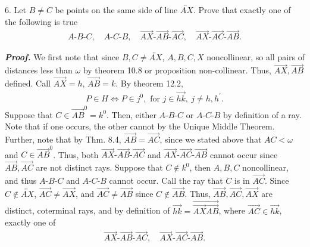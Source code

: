 \documentclass{report}
\begin{document}
    \pagebreak \bigbreak \noindent 
    \begin{mdframed}
        6. Let $B \ne C$ be points on the same side of line $\overleftrightarrow{AX}$. Prove that exactly one of the following is true
        \begin{align*}
            A\text{-}B\text{-}C, \quad A\text{-}C\text{-}B, \quad \overrightarrow{AX}\text{-}\overrightarrow{AB}\text{-}\overrightarrow{AC}, \quad \overrightarrow{AX}\text{-}\overrightarrow{AC}\text{-}\overrightarrow{AB}
        .\end{align*}
    \end{mdframed}
    \bigbreak \noindent 
    \textbf{\textit{Proof.}} We first note that since $B,C \ne \overleftrightarrow{AX}$, $A,B,C,X$ noncollinear, so all pairs of distances less than $\omega$ by theorem 10.8 or proposition non-collinear. Thus, $\overrightarrow{AX},\overrightarrow{AB}$ defined. Call $\overrightarrow{AX} = h$, $ \overrightarrow{AB} = k$. By theorem 12.2, 
    \begin{align*}
        P \in H \iff P \in j^{0}, \text{ for } j\in \overrightarrow{hk},\ j\ne h, h^{\prime}
    .\end{align*}
    \bigbreak \noindent 
    Suppose that $C \in \overrightarrow{AB}^{0} = k^{0}$. Then, either $ A\text{-}B\text{-}C$ or $ A\text{-}C\text{-}B$ by definition of a ray. Note that if one occurs, the other cannot by the Unique Middle Theorem.
    \bigbreak \noindent 
    Further, note that by Thm. 8.4, $\overrightarrow{AB} = \overrightarrow{AC}$, since we stated above that $AC < \omega$ and $C \in \overrightarrow{AB}^{0}$. Thus, both $ \overrightarrow{AX}\text{-}\overrightarrow{AB}\text{-}\overrightarrow{AC}$ and $ \overrightarrow{AX}\text{-}\overrightarrow{AC}\text{-}\overrightarrow{AB}$ cannot occur since $ \overrightarrow{AB}, \overrightarrow{AC}$ are not distinct rays.
    \bigbreak \noindent 
    Suppose that $C \not\in k^{0}$, then $A,B,C$ noncollinear, and thus $ A\text{-}B\text{-}C$ and $ A\text{-}C\text{-}B$ cannot occur. Call the ray that $C$ is in $\overrightarrow{AC}$. Since $C \not \in \overleftrightarrow{AX}$, $\overrightarrow{AC} \ne \overrightarrow{AX}$, and $\overrightarrow{AC} \ne \overrightarrow{AB}$ since $C \not\in \overrightarrow{AB} $. Thus, $\overrightarrow{AB}, \overrightarrow{AC},\overrightarrow{AX}$ are distinct, coterminal rays, and by definition of $\overrightarrow{hk} = \overrightarrow{\overrightarrow{AX}\overrightarrow{AB}}$, where $\overrightarrow{AC} \in \overrightarrow{hk}$, exactly one of 
    \begin{align*}
        \overrightarrow{AX}\text{-}\overrightarrow{AB}\text{-}\overrightarrow{AC}, \quad \overrightarrow{AX}\text{-}\overrightarrow{AC}\text{-}\overrightarrow{AB}
    .\end{align*}
    \endpf
\end{document}
